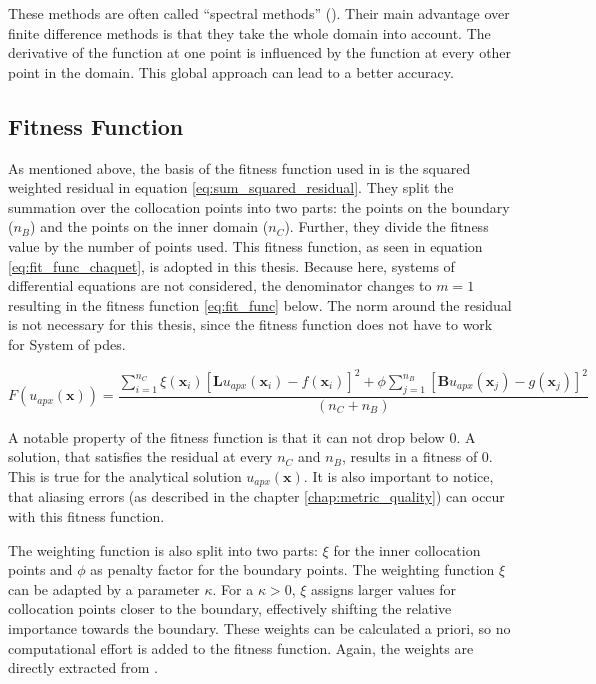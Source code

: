 \documentclass[./\jobname.tex]{subfiles}
\begin{document}
These methods are often called ``spectral methods'' (\cite{shen_spectral_2011}). Their main advantage over finite difference methods is that they take the whole domain into account. The derivative of the function at one point is influenced by the function at every other point in the domain. This global approach can lead to a better accuracy. 

\subsection{Fitness Function}
\label{chap:fit_func}

As mentioned above, the basis of the fitness function used in \cite{chaquet_using_2019} is the squared weighted residual in equation \eqref{eq:sum_squared_residual}. They split the summation over the collocation points into two parts: the points on the boundary ($n_B$) and the points on the inner domain ($n_C$). Further, they divide the fitness value by the number of points used. This fitness function, as seen in equation \eqref{eq:fit_func_chaquet}, is adopted in this thesis. Because here, systems of differential equations are not considered, the denominator changes to $m=1$ resulting in the fitness function \eqref{eq:fit_func} below. The norm around the residual is not necessary for this thesis, since the fitness function does not have to work for System of \gls{pde}s.

\begin{equation}
\label{eq:fit_func}
F(u_{apx}(\mathbf{x})) = \frac{\sum_{i=1}^{n_C} \xi (\mathbf{x}_i) \left[ \mathbf{L}u_{apx}(\mathbf{x}_i) - f(\mathbf{x}_i) \right]^2 + \phi \sum_{j=1}^{n_B} \left[ \mathbf{B}u_{apx}(\mathbf{x}_j) - g(\mathbf{x}_j)\right]^2}{(n_C + n_B)}  
\end{equation}

A notable property of the fitness function is that it can not drop below 0. A solution, that satisfies the residual at every $n_C$ and $n_B$, results in a fitness of 0. This is true for the analytical solution $u_{apx}(\mathbf{x})$. It is also important to notice, that aliasing errors (as described in the chapter \ref{chap:metric_quality}) can occur with this fitness function. 

The weighting function is also split into two parts: $\xi$ for the inner collocation points and $\phi$ as penalty factor for the boundary points. The weighting function $\xi$ can be adapted by a parameter $\kappa$. For a $\kappa > 0$, $\xi$ assigns larger values for collocation points closer to the boundary, effectively shifting the relative importance towards the boundary. These weights can be calculated a priori, so no computational effort is added to the fitness function. Again, the weights are directly extracted from \cite{chaquet_using_2019}. 
\end{document}
